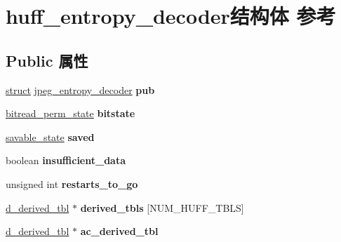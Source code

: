 \hypertarget{structhuff__entropy__decoder}{}\section{huff\+\_\+entropy\+\_\+decoder结构体 参考}
\label{structhuff__entropy__decoder}
\subsection*{Public 属性}
\begin{DoxyCompactItemize}
\item 
\mbox{\label{structhuff__entropy__decoder_a85f304c89441e96be66e49685cf24c3d}} 
\hyperlink{interfacestruct}{struct} \hyperlink{structjpeg__entropy__decoder}{jpeg\+\_\+entropy\+\_\+decoder} {\bfseries pub}
\item 
\mbox{\label{structhuff__entropy__decoder_a06e5f8944ccb6057c6f72b3df2441223}} 
\hyperlink{structbitread__perm__state}{bitread\+\_\+perm\+\_\+state} {\bfseries bitstate}
\item 
\mbox{\label{structhuff__entropy__decoder_a0e0efb55a8a5b01e1e49aa9c3fb8dfe6}} 
\hyperlink{structsavable__state}{savable\+\_\+state} {\bfseries saved}
\item 
\mbox{\label{structhuff__entropy__decoder_a412a9c88d74ed51774d25757b602b7ae}} 
boolean {\bfseries insufficient\+\_\+data}
\item 
\mbox{\label{structhuff__entropy__decoder_af6005b639dada949c62767bed24daa1a}} 
unsigned int {\bfseries restarts\+\_\+to\+\_\+go}
\item 
\mbox{\label{structhuff__entropy__decoder_a615d2735aebeee55b9820f09700677be}} 
\hyperlink{structd__derived__tbl}{d\+\_\+derived\+\_\+tbl} $\ast$ {\bfseries derived\+\_\+tbls} \mbox{[}N\+U\+M\+\_\+\+H\+U\+F\+F\+\_\+\+T\+B\+LS\mbox{]}
\item 
\mbox{\label{structhuff__entropy__decoder_adbbf18c6aa3065d9bcf6bf33079733e0}} 
\hyperlink{structd__derived__tbl}{d\+\_\+derived\+\_\+tbl} $\ast$ {\bfseries ac\+\_\+derived\+\_\+tbl}

\end{DoxyCompactItemize}
